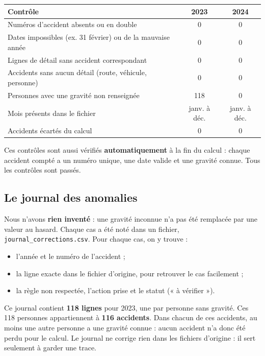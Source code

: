 \documentclass[11pt,a4paper]{article}
\begin{document}
\begin{center}
\begin{tabularx}{\linewidth}{@{}X c c@{}}
  \toprule
  \textbf{Contrôle} & \textbf{2023} & \textbf{2024} \\
  \midrule
  Numéros d'accident absents ou en double              & 0 & 0 \\
  Dates impossibles (ex. 31 février) ou de la mauvaise année & 0 & 0 \\
  Lignes de détail sans accident correspondant         & 0 & 0 \\
  Accidents sans aucun détail (route, véhicule, personne) & 0 & 0 \\
  Personnes avec une gravité non renseignée            & 118 & 0 \\
  Mois présents dans le fichier                        & janv. à déc. & janv. à déc. \\
  Accidents écartés du calcul                          & 0 & 0 \\
  \bottomrule
\end{tabularx}
\end{center}

Ces contrôles sont aussi vérifiés \textbf{automatiquement} à la fin du calcul :
chaque accident compté a un numéro unique, une date valide et une gravité
connue. Tous les contrôles sont passés.

\subsection{Le journal des anomalies}

Nous n'avons \textbf{rien inventé} : une gravité inconnue n'a pas été
remplacée par une valeur au hasard. Chaque cas a été noté dans un fichier,
\texttt{journal\_corrections.csv}. Pour chaque cas, on y trouve :
\begin{itemize}
  \item l'année et le numéro de l'accident ;
  \item la ligne exacte dans le fichier d'origine, pour retrouver le cas facilement ;
  \item la règle non respectée, l'action prise et le statut (« à vérifier »).
\end{itemize}

Ce journal contient \textbf{118 lignes} pour 2023, une par personne sans
gravité. Ces 118 personnes appartiennent à \textbf{116 accidents}. Dans chacun
de ces accidents, au moins une autre personne a une gravité connue : aucun
accident n'a donc été perdu pour le calcul. Le journal ne corrige rien dans
les fichiers d'origine : il sert seulement à garder une trace.
\end{document}
